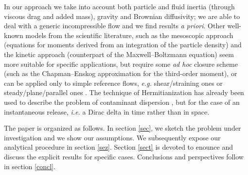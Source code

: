 In our approach we take into account both particle and fluid inertia (through viscous drag and added mass), gravity and Brownian diffusivity;
we are able to deal with a generic incompressible flow and we find results \emph{a priori}.
Other well-known models from the scientific literature, such as the mesoscopic approach (equations for moments
derived from an integration of the particle density) \cite{SFL02,FSS05} and the kinetic approach (counterpart of the
Maxwell--Boltzmann equation) \cite{R91,R92} seem more suitable for specific applications,
but require some \emph{ad hoc} closure scheme (such as the Chapman--Enskog approximation for the third-order moment),
or can be applied only to simple reference flows, \emph{e.g.} shear/straining ones \cite{R05,SARD09} or steady/plane/parallel ones \cite{S88,S90}.
The technique of Hermitianization has already been used to describe the problem of contaminant dispersion \cite{S85},
but for the case of an instantaneous release, \emph{i.e.} a Dirac delta in time rather than in space.

The paper is organized as follows.
In section \ref{sec}, we sketch the problem under investigation and we show our assumptions.
We subsequently expose our analytical procedure in section \ref{sez}.
Section \ref{sect} is devoted to enounce and discuss the explicit results for specific cases.
Conclusions and perspectives follow in section \ref{concl}.
%
